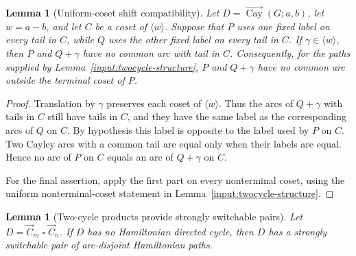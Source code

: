 \documentclass[11pt]{article}
\newtheorem{lemma}[theorem]{Lemma}
\newcommand{\Cay}{\overrightarrow{\operatorname{Cay}}}
\newcommand{\Boxprod}{\mathbin{\square}}
\begin{document}
\begin{lemma}[Uniform-coset shift compatibility]\label{lem:uniform-coset-shift}
Let $D=\Cay(G;a,b)$, let $w=a-b$, and let $C$ be a coset of $\langle w\rangle$.  Suppose that $P$ uses one fixed label on every tail in $C$, while $Q$ uses the other fixed label on every tail in $C$.  If $\gamma\in\langle w\rangle$, then $P$ and $Q+\gamma$ have no common arc with tail in $C$.  Consequently, for the paths supplied by Lemma~\ref{input:twocycle-structure}, $P$ and $Q+\gamma$ have no common arc outside the terminal coset of $P$.
\end{lemma}

\begin{proof}
Translation by $\gamma$ preserves each coset of $\langle w\rangle$.  Thus the arcs of $Q+\gamma$ with tails in $C$ still have tails in $C$, and they have the same label as the corresponding arcs of $Q$ on $C$.  By hypothesis this label is opposite to the label used by $P$ on $C$.  Two Cayley arcs with a common tail are equal only when their labels are equal.  Hence no arc of $P$ on $C$ equals an arc of $Q+\gamma$ on $C$.

For the final assertion, apply the first part on every nonterminal coset, using the uniform nonterminal-coset statement in Lemma~\ref{input:twocycle-structure}.
\end{proof}

\begin{lemma}[Two-cycle products provide strongly switchable pairs]\label{lem:two-cycle-strong}
Let $D=\vec C_m\Boxprod\vec C_n$.  If $D$ has no Hamiltonian directed cycle, then $D$ has a strongly switchable pair of arc-disjoint Hamiltonian paths.
\end{lemma}
\end{document}
